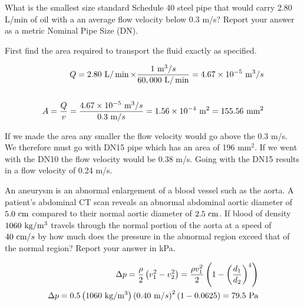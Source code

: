 \documentclass[multi,preview,varwidth=false,border=5,12pt]{standalone}
\begin{document}
\begin{question}

What is the smallest size standard Schedule 40 steel pipe that would carry 2.80 L/min of oil with a an average flow velocity below 0.3 m/s?  Report your answer as a metric Nominal Pipe Size (DN).

\begin{solution}
First find the area required to transport the fluid exactly as specified.

\begin{align*}
Q=2.80~\mathrm{L}/\min \times \frac{1~\mathrm{m}^3/s}{60,000~\mathrm{L}/\min} = 4.67\times 10^{-5}~\mathrm{m}^3/s\\
\\
A=\frac{Q}{v}=\frac{4.67\times 10^{-5}~\mathrm{m}^3/s}{0.3~\mathrm{m}/s}=1.56\times 10^{-4}~\mathrm{m}^2=155.56~\mathrm{mm}^2
\end{align*}

If we made the area any smaller the flow velocity would go above the 0.3 m/s.
We therefore must go with DN15 pipe which has an area of 196 mm$^2$.  If we went with the DN10 the flow velocity would be 0.38 m/s.  Going with the DN15 results in a flow velocity of 0.24 m/s.

\end{solution}

\end{question}



\begin{question}

An aneurysm is an abnormal enlargement of a blood vessel such as the aorta.  A  patient's abdominal CT scan reveals an abnormal abdominal aortic diameter of $5.0~\mathrm{cm}$ compared to their normal aortic diameter of $2.5~\mathrm{cm}$.  If blood of density $1060~\mathrm{kg}/\mathrm{m}^3$ travels through the normal portion of the aorta at a speed of $40~\mathrm{cm}/s$ by how much does the pressure in the abnormal region exceed that of the normal region?  Report your answer in kPa.

\begin{solution}
\begin{align*}
\Delta p = \frac{\rho}{2}\left(v_1^2-v_2^2\right)=\frac{\rho v_1^2}{2}\left(1-\left(\frac{d_1}{d_2}\right)^4\right)\\
\Delta p = 0.5\left(1060~\mathrm{kg}/\mathrm{m}^3\right)\left(0.40~\mathrm{m}/s\right)^2\left(1-0.0625\right)=79.5~\mathrm{Pa}
\end{align*}
\end{solution}

\end{question}
\end{document}
